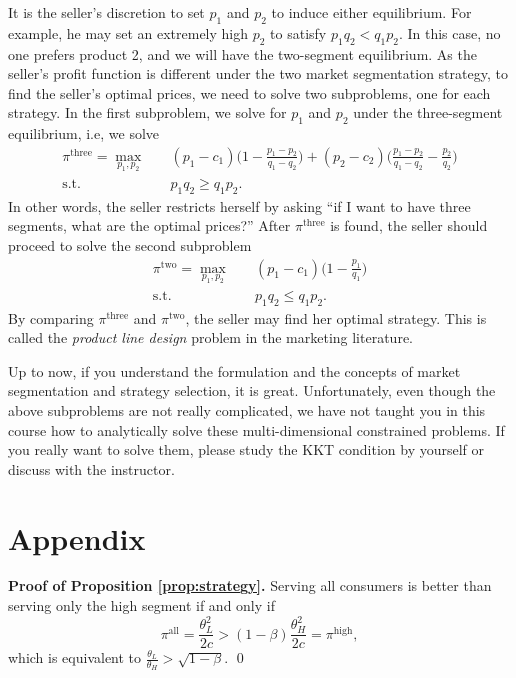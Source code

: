 \documentclass[11pt,a4paper]{article}
\begin{document}
It is the seller's discretion to set $p_1$ and $p_2$ to induce either equilibrium. 
For example, he may set an extremely high $p_2$ to satisfy $p_1 q_2 < q_1 p_2$. 
In this case, no one prefers product 2, and we will have the two-segment equilibrium. 
As the seller's profit function is different under the two market segmentation
strategy, to find the seller's optimal prices, we need to solve two subproblems, 
one for each strategy. In the first subproblem, we solve for $p_1$ and $p_2$ 
under the three-segment equilibrium, i.e, we solve 
\[\begin{split}
	\pi^{\mathrm{three}} = \max_{p_1, p_2} \quad & 
		(p_1 - c_1)\bigg(1 - \frac{p_1 - p_2}{q_1 - q_2}\bigg)
		+ (p_2 - c_2)\bigg(\frac{p_1 - p_2}{q_1 - q_2} - \frac{p_2}{q_2}\bigg) \\
	\mbox{s.t.} \quad & p_1q_2 \geq q_1p_2. 
\end{split}\]
In other words, the seller restricts herself by asking ``if I want to have 
three segments, what are the optimal prices?'' After $\pi^{\mathrm{three}}$ is found, 
the seller should proceed to solve the second subproblem
\[\begin{split}
	\pi^{\mathrm{two}} = \max_{p_1, p_2} \quad & 
		(p_1 - c_1)\bigg(1 - \frac{p_1}{q_1}\bigg) \\
	\mbox{s.t.} \quad & p_1q_2 \leq q_1p_2. 
\end{split}\]
By comparing $\pi^{\mathrm{three}}$ and $\pi^{\mathrm{two}}$, the seller may 
find her optimal strategy. This is called the \textit{product line design} 
problem in the marketing literature. 

Up to now, if you understand the formulation and the concepts of market segmentation
and strategy selection, it is great. Unfortunately, even though the above 
subproblems are not really complicated, we have not taught you in this course 
how to analytically solve these multi-dimensional constrained problems. 
If you really want to solve them, please study the KKT condition by yourself 
or discuss with the instructor. 






\section*{Appendix}

\textbf{Proof of Proposition \ref{prop:strategy}.} 
Serving all consumers is better than serving only the high segment if and only if 
\[
	\pi^{\mathrm{all}} = \frac{\theta_L^2}{2c} 
	> (1 - \beta) \frac{\theta_H^2}{2c} = \pi^{\mathrm{high}}, 
\]
which is equivalent to $\frac{\theta_L}{\theta_H} > \sqrt{1 - \beta}$. \qed
\end{document}
